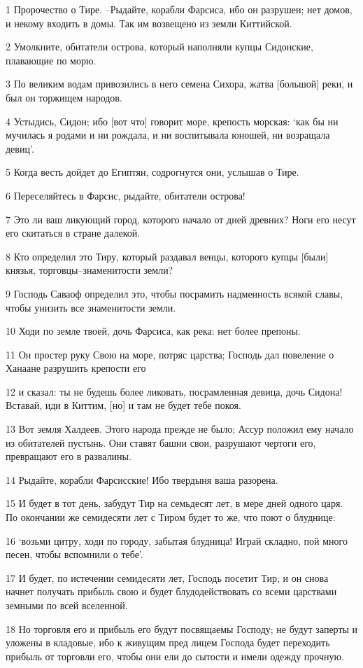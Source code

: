 \par 1 Пророчество о Тире. --Рыдайте, корабли Фарсиса, ибо он разрушен; нет домов, и некому входить в домы. Так им возвещено из земли Киттийской.
\par 2 Умолкните, обитатели острова, который наполняли купцы Сидонские, плавающие по морю.
\par 3 По великим водам привозились в него семена Сихора, жатва [большой] реки, и был он торжищем народов.
\par 4 Устыдись, Сидон; ибо [вот что] говорит море, крепость морская: `как бы ни мучилась я родами и ни рождала, и ни воспитывала юношей, ни возращала девиц'.
\par 5 Когда весть дойдет до Египтян, содрогнутся они, услышав о Тире.
\par 6 Переселяйтесь в Фарсис, рыдайте, обитатели острова!
\par 7 Это ли ваш ликующий город, которого начало от дней древних? Ноги его несут его скитаться в стране далекой.
\par 8 Кто определил это Тиру, который раздавал венцы, которого купцы [были] князья, торговцы--знаменитости земли?
\par 9 Господь Саваоф определил это, чтобы посрамить надменность всякой славы, чтобы унизить все знаменитости земли.
\par 10 Ходи по земле твоей, дочь Фарсиса, как река: нет более препоны.
\par 11 Он простер руку Свою на море, потряс царства; Господь дал повеление о Ханаане разрушить крепости его
\par 12 и сказал: ты не будешь более ликовать, посрамленная девица, дочь Сидона! Вставай, иди в Киттим, [но] и там не будет тебе покоя.
\par 13 Вот земля Халдеев. Этого народа прежде не было; Ассур положил ему начало из обитателей пустынь. Они ставят башни свои, разрушают чертоги его, превращают его в развалины.
\par 14 Рыдайте, корабли Фарсисские! Ибо твердыня ваша разорена.
\par 15 И будет в тот день, забудут Тир на семьдесят лет, в мере дней одного царя. По окончании же семидесяти лет с Тиром будет то же, что поют о блуднице:
\par 16 `возьми цитру, ходи по городу, забытая блудница! Играй складно, пой много песен, чтобы вспомнили о тебе'.
\par 17 И будет, по истечении семидесяти лет, Господь посетит Тир; и он снова начнет получать прибыль свою и будет блудодействовать со всеми царствами земными по всей вселенной.
\par 18 Но торговля его и прибыль его будут посвящаемы Господу; не будут заперты и уложены в кладовые, ибо к живущим пред лицем Господа будет переходить прибыль от торговли его, чтобы они ели до сытости и имели одежду прочную.

